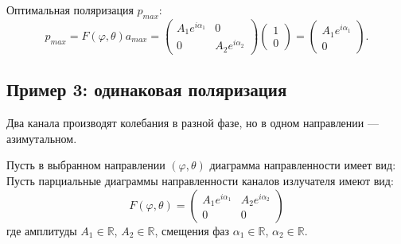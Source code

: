 Оптимальная поляризация $p_{max}$:
\[
    p_{max}
    = F(\varphi, \theta) a_{max}
    = \begin{pmatrix}
        A_1 e^{i \alpha_1} & 0                  \\
        0                  & A_2 e^{i \alpha_2}
    \end{pmatrix}
    \begin{pmatrix}
        1 \\
        0
    \end{pmatrix}
    = \begin{pmatrix}
        A_1 e^{i \alpha_1} \\
        0
    \end{pmatrix} .
\]

\subsection{Пример 3: одинаковая поляризация}

Два канала производят колебания в разной фазе, но в одном направлении --- азимутальном.

Пусть в выбранном направлении $(\varphi, \theta)$ диаграмма направленности имеет вид:
Пусть парциальные диаграммы направленности каналов излучателя имеют вид:
\[
    F(\varphi, \theta)
    =
    \begin{pmatrix}
        A_1 e^{i \alpha_1} & A_2 e^{i \alpha_2} \\
        0                  & 0
    \end{pmatrix}
\]
где амплитуды $A_1 \in \mathbb{R}$, $A_2 \in \mathbb{R}$, смещения фаз $\alpha_1 \in \mathbb{R}$, $\alpha_2 \in \mathbb{R}$.

